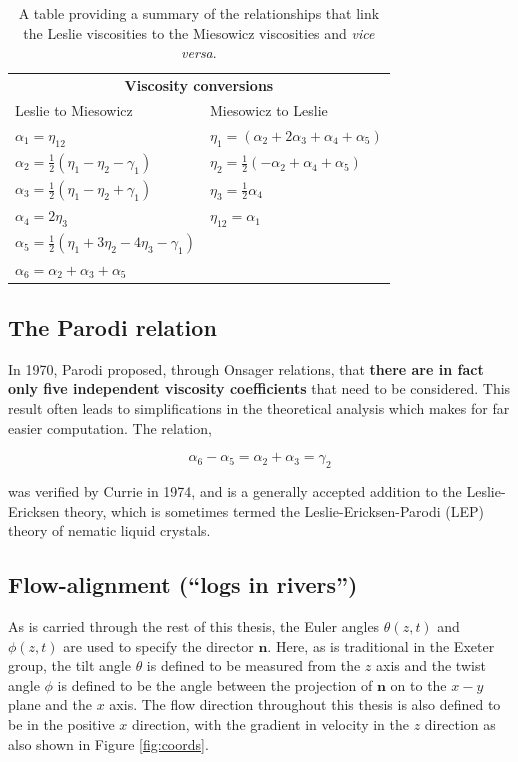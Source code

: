 \begin{table}
\centering
\begin{tabular}{ll} 
\hline\hline
\multicolumn{2}{c}{\textbf{Viscosity conversions}}\\             
Leslie to Miesowicz&Miesowicz to Leslie\\
\hline
$\alpha_1=\eta_{12}$&$\eta_1=\left(\alpha_2+2\alpha_3+\alpha_4+\alpha_5\right)$\\
$\alpha_2=\frac{1}{2}\left(\eta_1-\eta_2-\gamma_1\right)$&$\eta_2=\frac{1}{2}\left(-\alpha_2+\alpha_4+\alpha_5\right)$\\
$\alpha_3=\frac{1}{2}\left(\eta_1-\eta_2+\gamma_1\right)$&$\eta_3=\frac{1}{2}\alpha_4$\\
$\alpha_4=2\eta_3$&$\eta_{12}=\alpha_1$\\
$\alpha_5=\frac{1}{2}\left(\eta_1+3\eta_2-4\eta_3-\gamma_1\right)$&\\
$\alpha_6=\alpha_2+\alpha_3+\alpha_5$&\\
\hline
\end{tabular}
\caption[Relationships between the Leslie and Miesowicz viscosities]{A table providing a summary of the relationships that link the Leslie viscosities to the Miesowicz viscosities and \textit{vice versa}.} 
\label{tab:viscosity_relations}
\end{table}

\subsection{The Parodi relation}
In 1970, Parodi \cite{Parodi1970} proposed, through Onsager relations, that \textbf{there are in fact only five independent viscosity coefficients} that need to be considered. This result often leads to simplifications in the theoretical analysis which makes for far easier computation. The relation,

\begin{equation}
 \alpha_6-\alpha_5=\alpha_2+\alpha_3=\gamma_2
\end{equation}

\noindent was verified by Currie \cite{Currie1974} in 1974, and is a generally accepted addition to the Leslie-Ericksen theory, which is sometimes termed the Leslie-Ericksen-Parodi (LEP) theory of nematic liquid crystals.

\subsection{Flow-alignment (``logs in rivers'')}
\label{sec:logs}
As is carried through the rest of this thesis, the Euler angles $\theta\left(z,t\right)$ and $\phi\left(z,t\right)$ are used to specify the director $\mathbf{n}$. Here, as is traditional in the Exeter group, the tilt angle $\theta$ is defined to be measured from the $z$ axis and the twist angle $\phi$ is defined to be the angle between the projection of $\mathbf{n}$ on to the $x-y$ plane and the $x$ axis. The flow direction throughout this thesis is also defined to be in the positive $x$ direction, with the gradient in velocity in the $z$ direction as also shown in Figure \ref{fig:coords}. 

